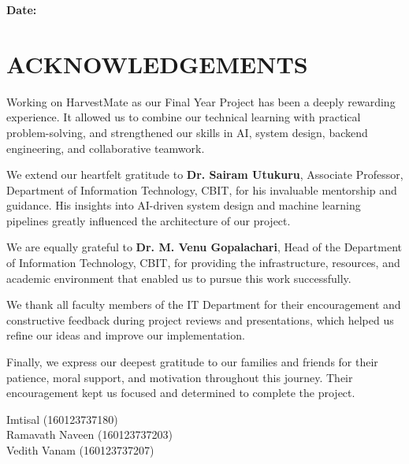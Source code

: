 \documentclass[12pt,a4paper]{report}
\begin{document}
\vspace{1.5cm}
\noindent\textbf{Date:} \underline{\hspace{4cm}}

\clearpage

\chapter*{ACKNOWLEDGEMENTS}

Working on HarvestMate as our Final Year Project has been a deeply rewarding experience. It allowed us to combine our technical learning with practical problem-solving, and strengthened our skills in AI, system design, backend engineering, and collaborative teamwork.  

We extend our heartfelt gratitude to \textbf{Dr. Sairam Utukuru}, Associate Professor, Department of Information Technology, CBIT, for his invaluable mentorship and guidance. His insights into AI-driven system design and machine learning pipelines greatly influenced the architecture of our project.  

We are equally grateful to \textbf{Dr. M. Venu Gopalachari}, Head of the Department of Information Technology, CBIT, for providing the infrastructure, resources, and academic environment that enabled us to pursue this work successfully.  

We thank all faculty members of the IT Department for their encouragement and constructive feedback during project reviews and presentations, which helped us refine our ideas and improve our implementation.    

Finally, we express our deepest gratitude to our families and friends for their patience, moral support, and motivation throughout this journey. Their encouragement kept us focused and determined to complete the project.  

\vspace{1cm}
\begin{flushright}
Imtisal (160123737180)\\
Ramavath Naveen (160123737203)\\
Vedith Vanam (160123737207)
\end{flushright}


\clearpage

\end{document}

